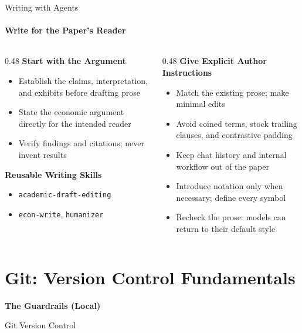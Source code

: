 \documentclass[11pt,aspectratio=169]{beamer}
\begin{document}
\begin{frame}{Writing with Agents}
\framesubtitle{Write for the Paper's Reader}
\begin{columns}[t]
\begin{column}{0.48\textwidth}
\textbf{Start with the Argument}
\begin{itemize}\setlength{\itemsep}{5pt}
    \item Establish the claims, interpretation, and exhibits before drafting prose
    \item State the economic argument directly for the intended reader
    \item Verify findings and citations; never invent results
\end{itemize}
\vspace{0.2cm}
\textbf{Reusable Writing Skills}
\begin{itemize}\setlength{\itemsep}{2pt}
    \item \texttt{academic-draft-editing}
    \item \texttt{econ-write}, \texttt{humanizer}
\end{itemize}
\end{column}
\begin{column}{0.48\textwidth}
\textbf{Give Explicit Author Instructions}
\begin{itemize}\setlength{\itemsep}{5pt}
    \item Match the existing prose; make minimal edits
    \item Avoid coined terms, stock trailing clauses, and contrastive padding
    \item Keep chat history and internal workflow out of the paper
    \item Introduce notation only when necessary; define every symbol
    \item Recheck the prose: models can return to their default style
\end{itemize}
\end{column}
\end{columns}
\end{frame}


\section{Git: Version Control Fundamentals}

\begin{frame}[plain]
    \centering
    \vspace{1cm}
    \textbf{\Huge The Guardrails (Local)}

    \vspace{0.5cm}
    {\Large Git Version Control}

    \vspace{1.5cm}
\end{frame}
\end{document}
